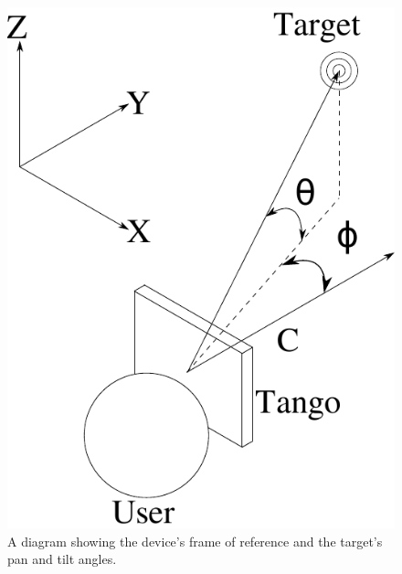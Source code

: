 \documentclass[sigconf, screen=true, anonymous=true]{acmart}
\begin{document}

\begin{figure}
  \centering
  \includegraphics[width=0.4\columnwidth]{figures/camera_coordinate.pdf}
  \caption{A diagram showing the device's frame of reference and the target's pan and tilt angles.}\label{fig:cam-coords}
\end{figure}
\end{document}
